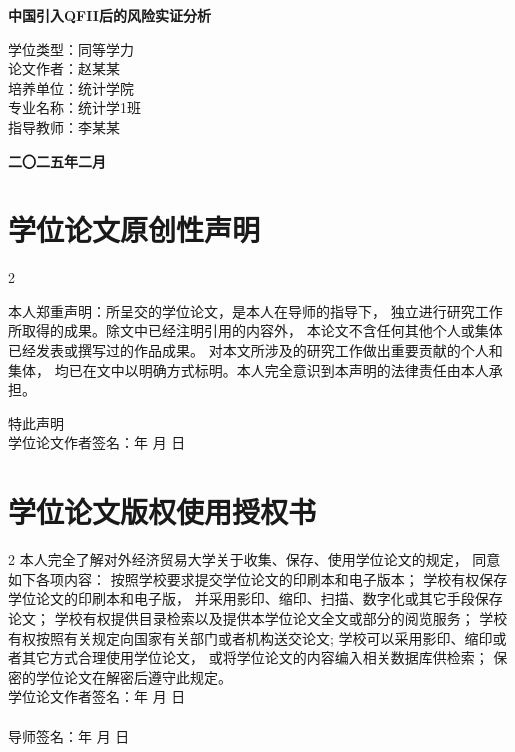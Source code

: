 \documentclass[UTF8,a4paper,boldfont]{ctexart}
\begin{document}
\thispagestyle{empty}
\begin{center}
    \vspace*{2cm}
    {\heiti\bfseries{} 中国引入QFII后的风险实证分析}
    
    \vspace{3cm}
    {\songti\bfseries{}
    \begin{minipage}{0.4\textwidth}
    学位类型：同等学力 \\
    论文作者：赵某某 \\
    培养单位：统计学院 \\
    专业名称：统计学1班 \\
    指导教师：李某某\\
    \end{minipage}
    }
    
    \vfill
    {\heiti\bfseries{} 二〇二五年二月}
\end{center}

\newpage
\thispagestyle{empty}
\section*{学位论文原创性声明}
\vspace{3.5cm}
\begin{spacing}{2}
{\heiti{}
本人郑重声明：所呈交的学位论文，是本人在导师的指导下，
独立进行研究工作所取得的成果。除文中已经注明引用的内容外，
本论文不含任何其他个人或集体已经发表或撰写过的作品成果。
对本文所涉及的研究工作做出重要贡献的个人和集体，
均已在文中以明确方式标明。本人完全意识到本声明的法律责任由本人承担。

特此声明\\[6cm]

\noindent 学位论文作者签名：\quad \quad \quad \quad \quad \quad 年 \quad 月 \quad 日}
\end{spacing}

\newpage
\thispagestyle{empty}
\section*{学位论文版权使用授权书}
\vspace{2cm}
\begin{spacing}{2}
{\heiti{}
本人完全了解对外经济贸易大学关于收集、保存、使用学位论文的规定，
同意如下各项内容：
按照学校要求提交学位论文的印刷本和电子版本；
学校有权保存学位论文的印刷本和电子版，
并采用影印、缩印、扫描、数字化或其它手段保存论文；
学校有权提供目录检索以及提供本学位论文全文或部分的阅览服务；
学校有权按照有关规定向国家有关部门或者机构送交论文; 
学校可以采用影印、缩印或者其它方式合理使用学位论文，
或将学位论文的内容编入相关数据库供检索；
保密的学位论文在解密后遵守此规定。\\[2cm]

\noindent 学位论文作者签名：\quad \quad \quad \quad \quad \quad 年 \quad 月 \quad 日\\ \\
导师签名：\quad \quad \quad \quad \quad \quad \quad \quad 年 \quad 月 \quad 日}
\end{spacing}
\end{document}
